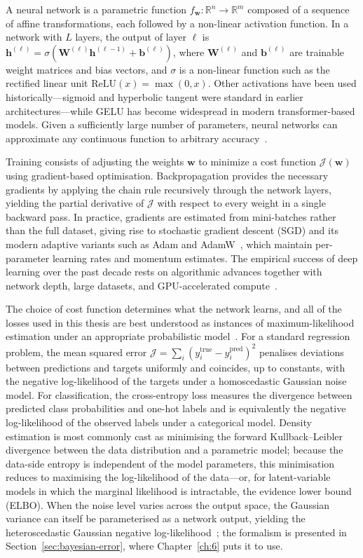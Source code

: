 A neural network is a parametric function $f_{\boldsymbol{w}}: \mathbb{R}^n \to \mathbb{R}^m$ composed of a sequence of affine transformations, each followed by a non-linear activation function.
In a network with $L$ layers, the output of layer $\ell$ is $\mathbf{h}^{(\ell)} = \sigma(\mathbf{W}^{(\ell)}\mathbf{h}^{(\ell-1)} + \mathbf{b}^{(\ell)})$, where $\mathbf{W}^{(\ell)}$ and $\mathbf{b}^{(\ell)}$ are trainable weight matrices and bias vectors, and $\sigma$ is a non-linear function such as the rectified linear unit $\mathrm{ReLU}(x) = \max(0, x)$.
Other activations have been used historically---sigmoid and hyperbolic tangent were standard in earlier architectures---while GELU has become widespread in modern transformer-based models.
Given a sufficiently large number of parameters, neural networks can approximate any continuous function to arbitrary accuracy~\cite{bishop,Goodfellow:2016dlbook}.

Training consists of adjusting the weights $\boldsymbol{w}$ to minimize a cost function $\mathcal{J}(\boldsymbol{w})$ using gradient-based optimisation.
Backpropagation provides the necessary gradients by applying the chain rule recursively through the network layers, yielding the partial derivative of $\mathcal{J}$ with respect to every weight in a single backward pass.
In practice, gradients are estimated from mini-batches rather than the full dataset, giving rise to stochastic gradient descent (SGD) and its modern adaptive variants such as Adam and AdamW~\cite{Loshchilov:2017bsp}, which maintain per-parameter learning rates and momentum estimates.
The empirical success of deep learning over the past decade rests on algorithmic advances together with network depth, large datasets, and GPU-accelerated compute~\cite{LeCun:2015pmr}.

The choice of cost function determines what the network learns, and all of the losses used in this thesis are best understood as instances of maximum-likelihood estimation under an appropriate probabilistic model~\cite{bishop,Murphy:2022pml}.
For a standard regression problem, the mean squared error $\mathcal{J} = \sum_i (y_i^\mathrm{true} - y_i^\mathrm{pred})^2$ penalises deviations between predictions and targets uniformly and coincides, up to constants, with the negative log-likelihood of the targets under a homoscedastic Gaussian noise model.
For classification, the cross-entropy loss measures the divergence between predicted class probabilities and one-hot labels and is equivalently the negative log-likelihood of the observed labels under a categorical model.
Density estimation is most commonly cast as minimising the forward Kullback--Leibler divergence between the data distribution and a parametric model; because the data-side entropy is independent of the model parameters, this minimisation reduces to maximising the log-likelihood of the data---or, for latent-variable models in which the marginal likelihood is intractable, the evidence lower bound (ELBO).
When the noise level varies across the output space, the Gaussian variance can itself be parameterised as a network output, yielding the heteroscedastic Gaussian negative log-likelihood~\cite{heteroscedastic-error}; the formalism is presented in Section~\ref{sec:bayesian-error}, where Chapter~\ref{ch:6} puts it to use.

